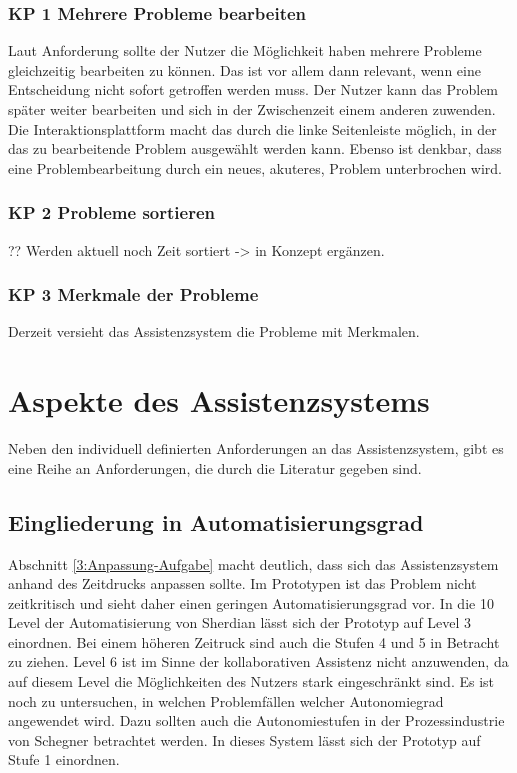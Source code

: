 \subsubsection*{KP 1 Mehrere Probleme bearbeiten}
Laut Anforderung sollte der Nutzer die Möglichkeit haben mehrere Probleme gleichzeitig bearbeiten zu können. Das ist vor allem dann relevant, wenn eine Entscheidung nicht sofort getroffen werden muss. Der Nutzer kann das Problem später weiter bearbeiten und sich in der Zwischenzeit einem anderen zuwenden. Die Interaktionsplattform macht das durch die linke Seitenleiste möglich, in der das zu bearbeitende Problem ausgewählt werden kann. Ebenso ist denkbar, dass eine Problembearbeitung durch ein neues, akuteres, Problem unterbrochen wird.

\subsubsection*{KP 2 Probleme sortieren}


??
Werden aktuell noch Zeit sortiert -> in Konzept ergänzen.

\subsubsection*{KP 3 Merkmale der Probleme}
Derzeit versieht das Assistenzsystem die Probleme mit Merkmalen. 

\section{Aspekte des Assistenzsystems}
Neben den individuell definierten Anforderungen an das Assistenzsystem, gibt es eine Reihe an Anforderungen, die durch die Literatur gegeben sind. 

\subsection*{Eingliederung in Automatisierungsgrad}
Abschnitt \ref{3:Anpassung-Aufgabe} macht deutlich, dass sich das Assistenzsystem anhand des Zeitdrucks anpassen sollte. Im Prototypen ist das Problem nicht zeitkritisch und sieht daher einen geringen Automatisierungsgrad vor. In die 10 Level der Automatisierung von Sherdian  lässt sich der Prototyp auf Level 3 einordnen. Bei einem höheren Zeitruck sind auch die Stufen 4 und 5 in Betracht zu ziehen. Level 6 ist im Sinne der kollaborativen Assistenz nicht anzuwenden, da auf diesem Level die Möglichkeiten des Nutzers stark eingeschränkt sind. Es ist noch zu untersuchen, in welchen Problemfällen welcher Autonomiegrad angewendet wird. Dazu sollten auch die Autonomiestufen in der Prozessindustrie von Schegner \cite{}  betrachtet werden. In dieses System lässt sich der Prototyp auf Stufe 1 einordnen.


